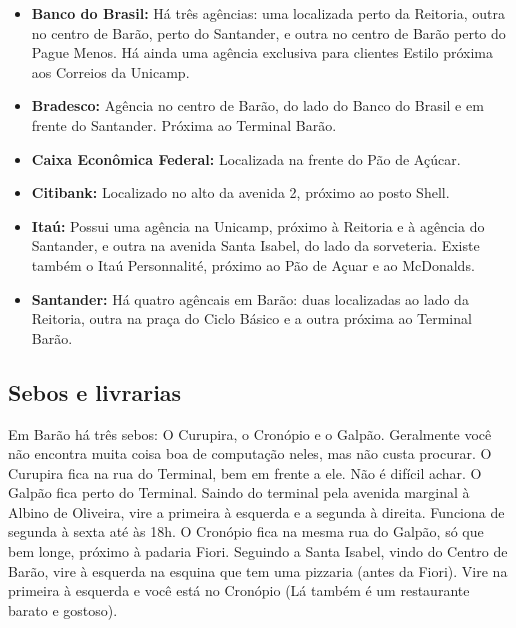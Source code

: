 \begin{itemize}
\item  \textbf{Banco do Brasil:} Há três agências: uma localizada perto da
        Reitoria, outra no centro de Barão, perto do Santander, e outra no
        centro de Barão perto do Pague Menos. Há ainda uma agência exclusiva
        para clientes Estilo próxima aos Correios da Unicamp.

\item  \textbf{Bradesco:} Agência no centro de Barão, do lado do Banco do
        Brasil e em frente do Santander. Próxima ao Terminal Barão.

\item  \textbf{Caixa Econômica Federal:} Localizada na frente do Pão de Açúcar.

\item  \textbf{Citibank:} Localizado no alto da avenida 2, próximo ao posto
        Shell.

\item  \textbf{Itaú:} Possui uma agência na Unicamp, próximo à Reitoria e à
        agência do Santander, e outra na avenida Santa Isabel, do lado da
        sorveteria. Existe também o Itaú Personnalité, próximo ao Pão de Açuar
        e ao McDonalds.

\item  \textbf{Santander:} Há quatro agêncais em Barão: duas localizadas ao lado
        da Reitoria, outra na praça do Ciclo Básico e a outra próxima ao
        Terminal Barão.
\end{itemize}

\subsection{Sebos e livrarias}

Em Barão há três sebos: O Curupira, o Cronópio e o Galpão. Geralmente você não
encontra muita coisa boa de computação neles, mas não custa procurar. O Curupira
fica na rua do Terminal, bem em frente a ele. Não é difícil achar. O Galpão fica
perto do Terminal. Saindo do terminal pela avenida marginal à Albino de
Oliveira, vire a primeira à esquerda e a segunda à direita. Funciona de segunda
à sexta até às 18h. O Cronópio fica na mesma rua do Galpão, só que bem longe,
próximo à padaria Fiori. Seguindo a Santa Isabel, vindo do Centro de Barão, vire
à esquerda na esquina que tem uma pizzaria (antes da Fiori). Vire na primeira
à esquerda e você está no Cronópio (Lá também é um restaurante barato
e gostoso).

